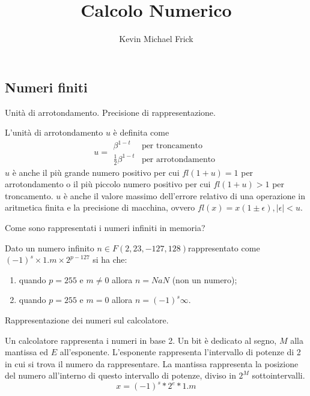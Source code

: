 \documentclass[answers, a4paper]{exam}
\title{Calcolo Numerico}
\author{Kevin Michael Frick}
\begin{document}
\maketitle
\begin{questions}
\section{Numeri finiti}

	\question Unità di arrotondamento. Precisione di rappresentazione.
	\begin{solution}
		L'unità di arrotondamento $u$ è definita come \begin{equation}u = \begin{array}{lcl} 
			\beta^{1 - t} & \text{per troncamento}  \\
			\frac{1}{2} \beta^{1 - t}& \text{per arrotondamento}
		\end{array}\end{equation} 
		$u$ è anche il più grande numero positivo per cui $fl(1 + u) = 1$ per arrotondamento o il più piccolo numero positivo per cui $fl(1 + u) > 1$ per troncamento.
		$u$ è anche il valore massimo dell'errore relativo di una operazione in aritmetica finita e la precisione di macchina, ovvero $fl(x) = x(1 \pm \epsilon), |\epsilon| < u$.
	\end{solution}
	\question Come sono rappresentati i numeri infiniti in memoria?
	\begin{solution}
		Dato un numero infinito $n \in F(2, 23, -127, 128)$rappresentato come $(-1)^s \times 1.m \times 2^{p - 127}$ si ha che:
		\begin{enumerate}
			\item quando $p = 255$ e $m \neq 0$ allora $n = NaN$ (non un numero); 
			\item quando $p = 255$ e $m = 0$ allora $n = (-1)^s \infty$.
		\end{enumerate}
	\end{solution}
	\question Rappresentazione dei numeri sul calcolatore.
	\begin{solution}
		Un calcolatore rappresenta i numeri in base 2.
		Un bit è dedicato al segno, $M$ alla mantissa ed $E$ all'esponente.
		L'esponente rappresenta l'intervallo di potenze di 2 in cui si trova il numero da rappresentare.
		La mantissa rappresenta la posizione del numero all'interno di questo intervallo di potenze, diviso in $2^M$ sottointervalli.
		\begin{equation}
			x = (-1)^s * 2^{e} * 1.m
		\end{equation}

\end{solution}
\end{questions}
\end{document}

